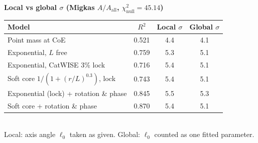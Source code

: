 \documentclass[border=12pt,varwidth=17cm]{standalone}
\begin{document}
\Large
\textbf{Local vs global $\sigma$ (Migkas $A/A_{\mathrm{all}}$, $\chi^2_{\text{null}}=45.14$)}\\[6pt]
\begin{tabular}{p{9.5cm}ccc}
\toprule
Model & $R^2$ & Local $\sigma$ & Global $\sigma$\\
\midrule
Point mass at CoE & 0.521 & 4.4 & 4.1\\
Exponential, $L$ free & 0.759 & 5.3 & 5.1\\
Exponential, CatWISE 3\% lock & 0.716 & 5.4 & 5.1\\
Soft core $1/(1+(r/L)^{0.3})$, lock & 0.743 & 5.4 & 5.1\\
Exponential (lock) + rotation \& phase & 0.845 & 5.5 & 5.3\\
Soft core + rotation \& phase & 0.870 & 5.4 & 5.1\\
\bottomrule
\end{tabular}\\[6pt]
\normalsize Local: axis angle $\ell_0$ taken as given. Global: $\ell_0$ counted as one fitted parameter.
\end{document}
